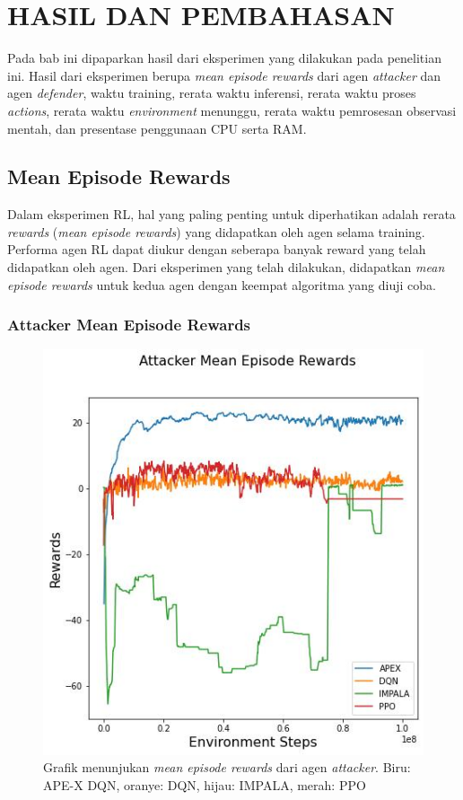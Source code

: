 \chapter{HASIL DAN PEMBAHASAN}
\label{chap:hasilpembahasan}

Pada bab ini dipaparkan hasil dari eksperimen yang dilakukan pada penelitian ini.
Hasil dari eksperimen berupa \emph{mean episode rewards} dari agen \emph{attacker} dan agen \emph{defender},
waktu training, rerata waktu inferensi, rerata waktu proses \emph{actions}, rerata waktu \emph{environment} menunggu,
rerata waktu pemrosesan observasi mentah, dan presentase penggunaan CPU serta RAM.

\section{Mean Episode Rewards}

Dalam eksperimen RL, hal yang paling penting untuk diperhatikan adalah rerata \emph{rewards} (\emph{mean episode rewards}) yang didapatkan oleh agen
selama training. Performa agen RL dapat diukur dengan seberapa banyak reward yang telah didapatkan oleh agen.
Dari eksperimen yang telah dilakukan, didapatkan \emph{mean episode rewards} untuk kedua agen dengan keempat algoritma yang diuji coba.

\subsection{Attacker Mean Episode Rewards}

\begin{figure}[H]
  \centering
    \includegraphics[scale=0.65]{gambar/attacker_reward_mean.jpg}
    \caption{Grafik menunjukan \emph{mean episode rewards} dari agen \emph{attacker}.
    Biru: APE-X DQN, oranye: DQN, hijau: IMPALA, merah: PPO}
    \label{fig:attackerMeanEpisodeGraph}
\end{figure}

